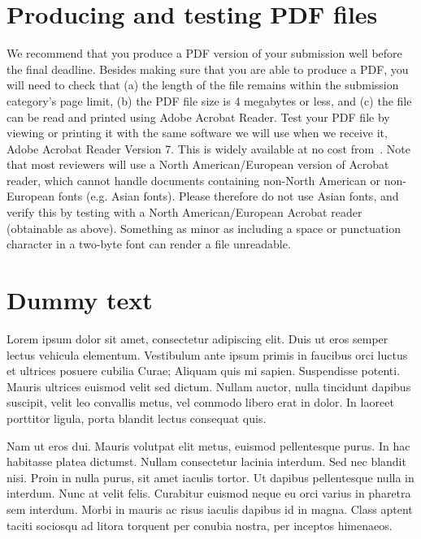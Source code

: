 \documentclass{chi-ext}
\begin{document}
\section{Producing and testing PDF files}
We recommend that you produce a PDF version of your submission well before the final deadline.
Besides making sure that you are able to produce a PDF, you will need to check that (a) the length of the file remains within the submission category's page limit, (b) the PDF file size is 4 megabytes or less, and (c) the file can be read and printed using Adobe Acrobat Reader.
Test your PDF file by viewing or printing it with the same software we will use when we receive it, Adobe Acrobat Reader Version 7.
This is widely available at no cost from~\cite{Acrobat7}.
Note that most reviewers will use a North American/European version of Acrobat reader, which cannot handle documents containing non-North American or non-European fonts (e.g. Asian fonts).
Please therefore do not use Asian fonts, and verify this by testing with a North American/European Acrobat reader (obtainable as above). Something as minor as including a space or punctuation character in a two-byte font can render a file unreadable.


\section{Dummy text}
Lorem ipsum dolor sit amet, consectetur adipiscing elit. Duis ut eros semper lectus vehicula elementum. Vestibulum ante ipsum primis in faucibus orci luctus et ultrices posuere cubilia Curae; Aliquam quis mi sapien. Suspendisse potenti. Mauris ultrices euismod velit sed dictum. Nullam auctor, nulla tincidunt dapibus suscipit, velit leo convallis metus, vel commodo libero erat in dolor. In laoreet porttitor ligula, porta blandit lectus consequat quis.

Nam ut eros dui. Mauris volutpat elit metus, euismod pellentesque purus. In hac habitasse platea dictumst. Nullam consectetur lacinia interdum. Sed nec blandit nisi. Proin in nulla purus, sit amet iaculis tortor. Ut dapibus pellentesque nulla in interdum. Nunc at velit felis. Curabitur euismod neque eu orci varius in pharetra sem interdum. Morbi in mauris ac risus iaculis dapibus id in magna. Class aptent taciti sociosqu ad litora torquent per conubia nostra, per inceptos himenaeos.
\end{document}
